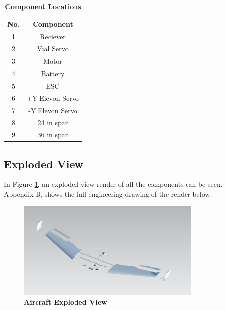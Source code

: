         \begin{table}[H]
        \begin{center}
        \caption{\textbf{Component Locations}} \label{tab:component_locations}
        \begin{tabular}{|c|c|} 
            \hline
            \textbf{No.} & \textbf{Component} \\ \hline
            1 & Reciever \\ \hline
            2 & Vial Servo \\ \hline
            3 & Motor \\ \hline
            4 & Battery \\ \hline
            5 & ESC \\ \hline
            6 & +Y Elevon Servo \\ \hline
            7 & -Y Elevon Servo \\ \hline
            8 & 24 in spar \\ \hline
            9 & 36 in spar \\ \hline
        \end{tabular}
        \end{center}
        \end{table}
        
    \subsection{Exploded View}
    
        In Figure \ref{fig:exploded}, an exploded view render of all the components can be seen. Appendix B, shows the full engineering drawing of the render below.
        
        \begin{figure}[H]
            \centering
            \includegraphics[width=0.8\textwidth]{homeworks/homework4/report/Figure/aircraft_assembly_exploded.png}
            \caption{\textbf{Aircraft Exploded View}}
            \label{fig:exploded}
        \end{figure}
    
